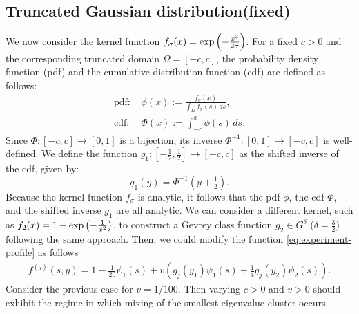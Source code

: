 \subsection{Truncated Gaussian distribution(fixed)}
We now consider the kernel function $f_{\sigma}(x)=\exp\left(-\frac{x^2}{2\sigma}\right)$. For a fixed $c > 0$ and the corresponding truncated domain $\Omega=[-c,c]$, the probability density function (pdf) and the cumulative distribution function (cdf) are defined as follows:
\begin{align}
    \text{pdf: }& \phi(x) := \frac{f_{\sigma}(x)}{\int_{\Omega}f_{\sigma}(s) \,ds}, \\
    \text{cdf: }& \Phi(x) := \int_{-c}^x \phi(s) \,ds.
\end{align}
Since $\Phi: [-c,c] \to [0,1]$ is a bijection, its inverse $\Phi^{-1}: [0,1] \to [-c,c]$ is well-defined. We define the function $g_1: [-\tfrac{1}{2},\tfrac{1}{2}] \to [-c,c]$ as the shifted inverse of the cdf, given by:
$$
g_1(y) = \Phi^{-1}(y+\tfrac{1}{2}).
$$
Because the kernel function $f_{\sigma}$ is analytic, it follows that the pdf $\phi$, the cdf $\Phi$, and the shifted inverse $g_1$ are all analytic. We can consider a different kernel, such as $f_2(x) = 1 - \exp\left(-\tfrac{1}{x^2}\right)$, to construct a Gevrey class function $g_2 \in G^{\delta}$ ($\delta=\tfrac{3}{2}$) following the same approach.
Then, we could modify the function \ref{eq:experiment-profile} as follows
\begin{align}
    f^{(j)}(s,y)= 1-\frac1{20}\psi_1(s)
       +v\left(g_j(y_1)\psi_1(s)+\frac{1}{4}g_j(y_2)\psi_2(s) \right).
\end{align}
Consider the previous case for $v = 1/100$. Then
varying $c >0$ and $v >0$ should exhibit the regime in which mixing of the smallest eigenvalue cluster occurs. 
